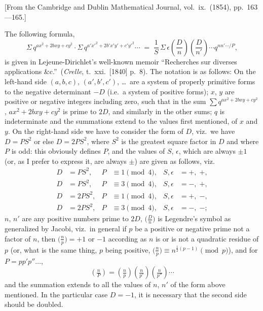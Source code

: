 \documentclass[11pt,a4paper]{article}
\theoremstyle{plain}
\begin{document}
[From the Cambridge and Dublin Mathematical Journal, vol.\ ix.\ (1854), pp.\ 163---165.]

\bigskip

The following formula,
\[\Sigma\, q^{ax^2 + 2bxy + cy^2} \cdot \Sigma\, q^{a' x'^2 + 2b' x' y' + c' y'^2} \cdots
\;=\; \frac{1}{S}\,\Sigma\, \epsilon\!\left(\frac{D}{n}\right)\!\left(\frac{D}{n'}\right)\cdots q^{n n' \cdots /P},\]
is given in Lejeune-Dirichlet's well-known memoir ``Recherches sur diverses applications \&c.''\ (\textit{Crelle}, t.\ xxi.\ [1840] p.\ 8). The notation is as follows: On the left-hand side $(a,b,c)$, $(a',b',c')$, \ldots\ are a system of properly primitive forms to the negative determinant $-D$ (i.e.\ a system of positive forms); $x$, $y$ are positive or negative integers including zero, such that in the sum $\sum q^{ax^2 + 2bxy + cy^2}$, $ax^2 + 2bxy + cy^2$ is prime to $2D$, and similarly in the other sums; $q$ is indeterminate and the summations extend to the values first mentioned, of $x$ and $y$. On the right-hand side we have to consider the form of $D$, viz.\ we have $D = PS^2$ or else $D = 2 P S^2$, where $S^2$ is the greatest square factor in $D$ and where $P$ is odd: this obviously defines $P$, and the values of $S$, $\epsilon$, which are always $\pm 1$ (or, as I prefer to express it, are always $\pm$) are given as follows, viz.
\begin{align*}
D &= P S^2,  & P &\equiv 1 \pmod 4, & S, \epsilon &= +,\; +,\\
D &= P S^2,  & P &\equiv 3 \pmod 4, & S, \epsilon &= -,\; +,\\
D &= 2 P S^2,& P &\equiv 1 \pmod 4, & S, \epsilon &= +,\; -,\\
D &= 2 P S^2,& P &\equiv 3 \pmod 4, & S, \epsilon &= -,\; -;
\end{align*}
$n$, $n'$ are any positive numbers prime to $2D$, $\bigl(\tfrac{D}{n}\bigr)$ is Legendre's symbol as generalized by Jacobi, viz.\ in general if $p$ be a positive or negative prime not a factor of $n$, then $\bigl(\tfrac{n}{p}\bigr) = +1$ or $-1$ according as $n$ is or is not a quadratic residue of $p$ (or, what is the same thing, $p$ being positive, $\bigl(\tfrac{n}{p}\bigr) \equiv n^{\frac{1}{2}(p-1)} \pmod p$), and for $P = p p' p'' \ldots$,
\[\left(\tfrac{n}{P}\right) = \left(\tfrac{n}{p}\right)\!\left(\tfrac{n}{p'}\right)\!\left(\tfrac{n}{p''}\right)\cdots\]
and the summation extends to all the values of $n$, $n'$ of the form above mentioned. In the particular case $D = -1$, it is necessary that the second side should be doubled.
\end{document}
